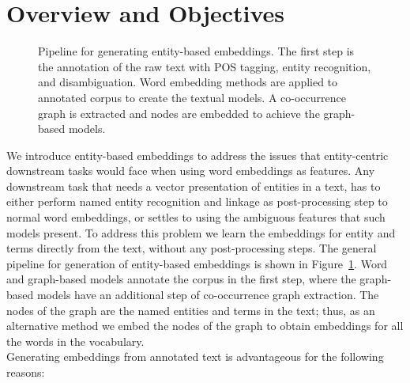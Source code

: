 \section{Overview and Objectives}\label{sec:entity_overview}
\begin{figure}
\centering 
\resizebox{0.97\textwidth}{0.32\textwidth}{      

}
\caption{Pipeline for generating entity-based embeddings. The first step is the annotation of the raw text with POS tagging, entity recognition, and disambiguation. Word embedding methods are applied to annotated corpus to create the textual models. A co-occurrence graph is extracted and nodes are embedded to achieve the graph-based models.}
\label{fig:entity_emebddings_pipline}
\end{figure}
We introduce entity-based embeddings to address the issues that entity-centric downstream tasks would face when using word embeddings as features. Any downstream task that needs a vector presentation of entities in a text, has to either perform named entity recognition and linkage as post-processing step to normal word embeddings, or settles to using the ambiguous features that such models present. To address this problem we learn the embeddings for entity and terms directly from the text, without any post-processing steps. The general pipeline for generation of entity-based embeddings is shown in Figure~\ref{fig:entity_emebddings_pipline}. Word and graph-based models annotate the corpus in the first step, where the graph-based models have an additional step of co-occurrence graph extraction. The nodes of the graph are the named entities and terms in the text; thus, as an alternative method we embed the nodes of the graph to obtain embeddings for all the words in the vocabulary. \\
Generating embeddings from annotated text is advantageous for the following reasons:
